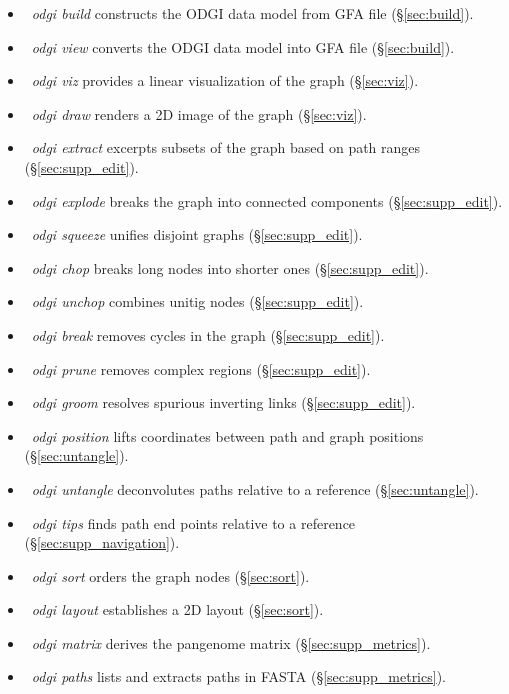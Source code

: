 \documentclass{bioinfo}
\newcommand{\red}[1]{{\textcolor{Red}{#1}}}
\newcommand{\FIXME}[1]{\red{[FIXME: #1]}}
\begin{document}
\begin{itemize}
\item~\textit{odgi build} constructs the ODGI data model from GFA file (\S\ref{sec:build}).
\item~\textit{odgi view} converts the ODGI data model into GFA file (\S\ref{sec:build}).
\item~\textit{odgi viz} provides a linear visualization of the graph (\S\ref{sec:viz}).
\item~\textit{odgi draw} renders a 2D image of the graph (\S\ref{sec:viz}).
\item~\textit{odgi extract} excerpts subsets of the graph based on path ranges (\S\ref{sec:supp_edit}).
\item~\textit{odgi explode} breaks the graph into connected components (\S\ref{sec:supp_edit}).
\item~\textit{odgi squeeze} unifies disjoint graphs (\S\ref{sec:supp_edit}).
\item~\textit{odgi chop} breaks long nodes into shorter ones (\S\ref{sec:supp_edit}).
\item~\textit{odgi unchop} combines unitig nodes (\S\ref{sec:supp_edit}).
\item~\textit{odgi break} removes cycles in the graph (\S\ref{sec:supp_edit}).
\item~\textit{odgi prune} removes complex regions (\S\ref{sec:supp_edit}).
\item~\textit{odgi groom} resolves spurious inverting links (\S\ref{sec:supp_edit}).
\item~\textit{odgi position} lifts coordinates between path and graph positions (\S\ref{sec:untangle}).%
\item~\textit{odgi untangle} deconvolutes paths relative to a reference (\S\ref{sec:untangle}).
\item~\textit{odgi tips} finds path end points relative to a reference (\S\ref{sec:supp_navigation}).
\item~\textit{odgi sort} orders the graph nodes (\S\ref{sec:sort}).
\item~\textit{odgi layout} establishes a 2D layout (\S\ref{sec:sort}).
\item~\textit{odgi matrix} derives the pangenome matrix (\S\ref{sec:supp_metrics}).
\item~\textit{odgi paths} lists and extracts paths in FASTA (\S\ref{sec:supp_metrics}).

\end{itemize}
\end{document}
